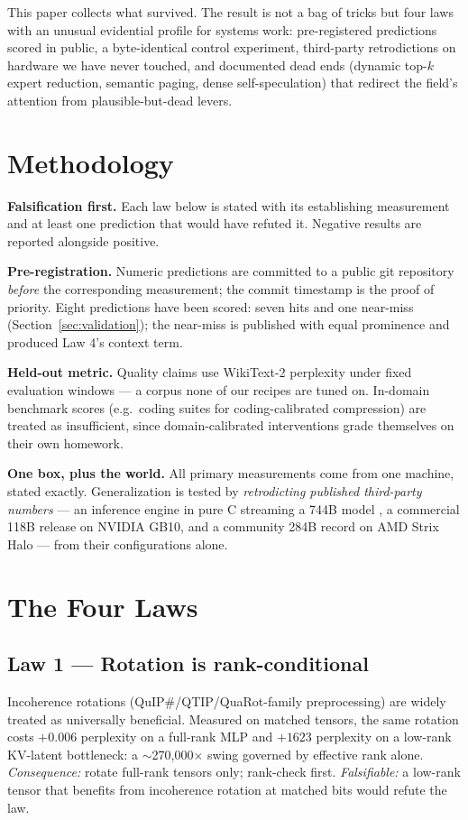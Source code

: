 \documentclass[11pt]{article}
\begin{document}
This paper collects what survived. The result is not a bag of tricks but four laws with an unusual
evidential profile for systems work: pre-registered predictions scored in public, a byte-identical
control experiment, third-party retrodictions on hardware we have never touched, and documented dead
ends (dynamic top-$k$ expert reduction, semantic paging, dense self-speculation) that redirect the
field's attention from plausible-but-dead levers.

\section{Methodology}
\textbf{Falsification first.} Each law below is stated with its establishing measurement and at
least one prediction that would have refuted it. Negative results are reported alongside positive.

\textbf{Pre-registration.} Numeric predictions are committed to a public git repository
\emph{before} the corresponding measurement; the commit timestamp is the proof of priority. Eight
predictions have been scored: seven hits and one near-miss (Section~\ref{sec:validation}); the
near-miss is published with equal prominence and produced Law 4's context term.

\textbf{Held-out metric.} Quality claims use WikiText-2 perplexity under fixed evaluation windows
--- a corpus none of our recipes are tuned on. In-domain benchmark scores (e.g.\ coding suites for
coding-calibrated compression) are treated as insufficient, since domain-calibrated interventions
grade themselves on their own homework.

\textbf{One box, plus the world.} All primary measurements come from one machine, stated exactly.
Generalization is tested by \emph{retrodicting published third-party numbers} --- an inference
engine in pure C streaming a 744B model \cite{colibri}, a commercial 118B release on NVIDIA GB10,
and a community 284B record on AMD Strix Halo --- from their configurations alone.

\section{The Four Laws}

\subsection{Law 1 --- Rotation is rank-conditional}
Incoherence rotations (QuIP\#/QTIP/QuaRot-family preprocessing) are widely treated as universally
beneficial. Measured on matched tensors, the same rotation costs $+0.006$ perplexity on a full-rank
MLP and $+1623$ perplexity on a low-rank KV-latent bottleneck: a $\sim$270{,}000$\times$ swing
governed by effective rank alone. \emph{Consequence:} rotate full-rank tensors only; rank-check
first. \emph{Falsifiable:} a low-rank tensor that benefits from incoherence rotation at matched bits
would refute the law.
\end{document}
